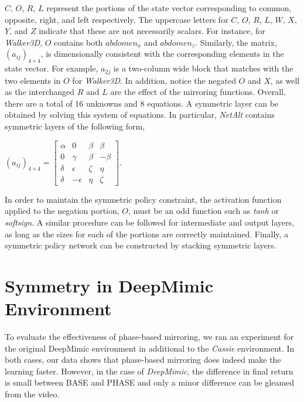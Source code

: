 $C$, $O$, $R$, $L$ represent the portions of the state vector corresponding to common, opposite, right, and left respectively.  The uppercase letters for $C$, $O$, $R$, $L$, $W$, $X$, $Y$, and $Z$ indicate that these are not necessarily scalars. For instance, for \textit{Walker3D}, $O$ contains both $abdomen_x$ and $abdomen_z$.  Similarly, the matrix, $(a_{ij})_{4\times4}$, is dimensionally consistent with the corresponding elements in the state vector.  For example, $a_{2j}$ is a two-column wide block that matches with the two elements in $O$ for \textit{Walker3D}.  In addition, notice the negated $O$ and $X$, as well as the interchanged $R$ and $L$ are the effect of the mirroring functions.  Overall, there are a total of 16 unknowns and 8 equations.  A symmetric layer can be obtained by solving this system of equations.  In particular, \textit{NetAlt} contains symmetric layers of the following form,

\begin{center}
$(a_{ij})_{4\times4} = \begin{bmatrix} 
\alpha &  0 & \beta & \beta \\ 
0 & \gamma & \beta & -\beta \\
\delta &  \epsilon & \zeta & \eta \\
\delta & -\epsilon & \eta & \zeta
\end{bmatrix}$.
\end{center}

In order to maintain the symmetric policy constraint, the activation function applied to the negation portion, $O$, must be an odd function such as \textit{tanh} or \textit{softsign}.  A similar procedure can be followed for intermediate and output layers, as long as the sizes for each of the portions are correctly maintained.  Finally, a symmetric policy network can be constructed by stacking symmetric layers.

\section{Symmetry in DeepMimic Environment}
\label{sec:deepmimic-results}

To evaluate the effectiveness of phase-based mirroring, we ran an experiment for the original DeepMimic environment \citep{2018-TOG-deepMimic} in additional to the \textit{Cassie} environment.  In both cases, our data shows that phase-based mirroring does indeed make the learning faster.  However, in the case of \textit{DeepMimic}, the difference in final return is small between BASE and PHASE and only a minor difference can be gleamed from the video.

